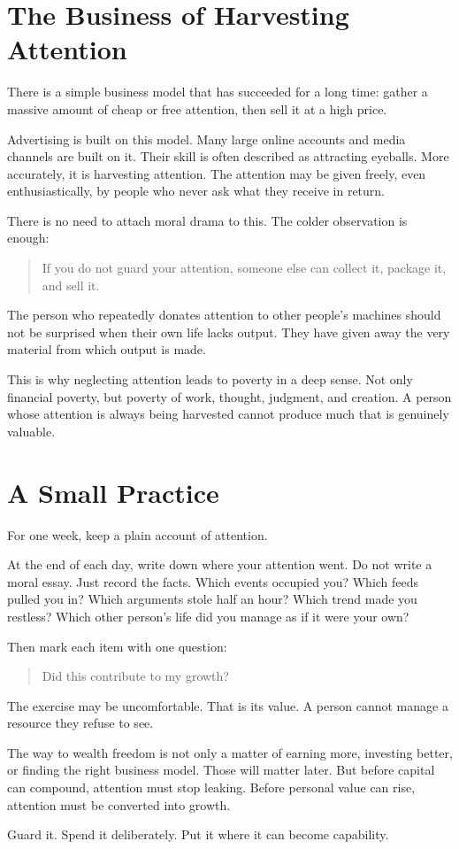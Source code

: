 \section*{The Business of Harvesting Attention}

There is a simple business model that has succeeded for a long time: gather a massive amount of cheap or free attention, then sell it at a high price.

Advertising is built on this model. Many large online accounts and media channels are built on it. Their skill is often described as attracting eyeballs. More accurately, it is harvesting attention. The attention may be given freely, even enthusiastically, by people who never ask what they receive in return.

There is no need to attach moral drama to this. The colder observation is enough:

\begin{quote}
If you do not guard your attention, someone else can collect it, package it, and sell it.
\end{quote}

The person who repeatedly donates attention to other people's machines should not be surprised when their own life lacks output. They have given away the very material from which output is made.

This is why neglecting attention leads to poverty in a deep sense. Not only financial poverty, but poverty of work, thought, judgment, and creation. A person whose attention is always being harvested cannot produce much that is genuinely valuable.

\section*{A Small Practice}

For one week, keep a plain account of attention.

At the end of each day, write down where your attention went. Do not write a moral essay. Just record the facts. Which events occupied you? Which feeds pulled you in? Which arguments stole half an hour? Which trend made you restless? Which other person's life did you manage as if it were your own?

Then mark each item with one question:

\begin{quote}
Did this contribute to my growth?
\end{quote}

The exercise may be uncomfortable. That is its value. A person cannot manage a resource they refuse to see.

The way to wealth freedom is not only a matter of earning more, investing better, or finding the right business model. Those will matter later. But before capital can compound, attention must stop leaking. Before personal value can rise, attention must be converted into growth.

Guard it. Spend it deliberately. Put it where it can become capability.
